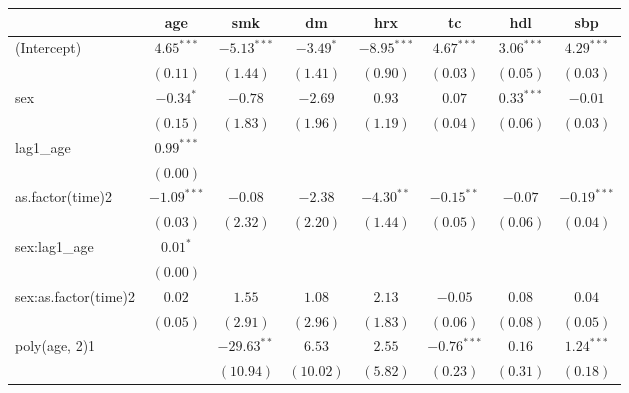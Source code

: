 
\begin{tabular}{l c c c c c c c}
\toprule
 & age & smk & dm & hrx & tc & hdl & sbp \\
\midrule
(Intercept)          & $4.65^{***}$  & $-5.13^{***}$ & $-3.49^{*}$ & $-8.95^{***}$ & $4.67^{***}$  & $3.06^{***}$  & $4.29^{***}$  \\
                     & $(0.11)$      & $(1.44)$      & $(1.41)$    & $(0.90)$      & $(0.03)$      & $(0.05)$      & $(0.03)$      \\
sex                  & $-0.34^{*}$   & $-0.78$       & $-2.69$     & $0.93$        & $0.07$        & $0.33^{***}$  & $-0.01$       \\
                     & $(0.15)$      & $(1.83)$      & $(1.96)$    & $(1.19)$      & $(0.04)$      & $(0.06)$      & $(0.03)$      \\
lag1\_age            & $0.99^{***}$  &               &             &               &               &               &               \\
                     & $(0.00)$      &               &             &               &               &               &               \\
as.factor(time)2     & $-1.09^{***}$ & $-0.08$       & $-2.38$     & $-4.30^{**}$  & $-0.15^{**}$  & $-0.07$       & $-0.19^{***}$ \\
                     & $(0.03)$      & $(2.32)$      & $(2.20)$    & $(1.44)$      & $(0.05)$      & $(0.06)$      & $(0.04)$      \\
sex:lag1\_age        & $0.01^{*}$    &               &             &               &               &               &               \\
                     & $(0.00)$      &               &             &               &               &               &               \\
sex:as.factor(time)2 & $0.02$        & $1.55$        & $1.08$      & $2.13$        & $-0.05$       & $0.08$        & $0.04$        \\
                     & $(0.05)$      & $(2.91)$      & $(2.96)$    & $(1.83)$      & $(0.06)$      & $(0.08)$      & $(0.05)$      \\
poly(age, 2)1        &               & $-29.63^{**}$ & $6.53$      & $2.55$        & $-0.76^{***}$ & $0.16$        & $1.24^{***}$  \\
                     &               & $(10.94)$     & $(10.02)$   & $(5.82)$      & $(0.23)$      & $(0.31)$      & $(0.18)$      \\

\end{tabular}
